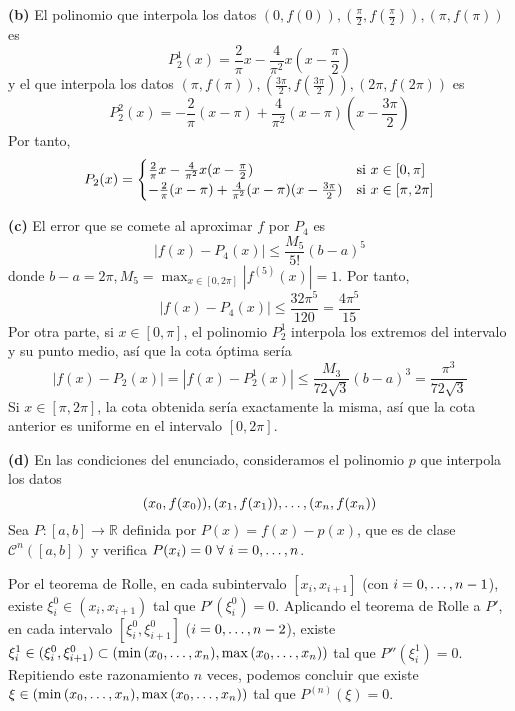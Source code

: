 \documentclass[12pt]{report}
\newcommand{\R}{\mathbb R}
\begin{document}
\vspace{2mm}
\textbf{(b) } El polinomio que interpola los datos $(0,f(0)),(\frac{\pi}{2},f(\frac{\pi}{2})),(\pi,f(\pi))$
es
\[P_2^1(x) = \frac{2}{\pi}x -\frac{4}{\pi^2}x(x-\frac{\pi}{2})\]
y el que interpola los datos $(\pi,f(\pi)),(\frac{3\pi}{2},f(\frac{3\pi}{2})),(2\pi,f(2\pi))$ es
\[P_2^2(x) = -\frac{2}{\pi}(x-\pi) + \frac{4}{\pi^2}(x-\pi)(x-\frac{3\pi}{2})\]
Por tanto,
\[P_2(x) = 
\begin{cases}
\frac{2}{\pi}x -\frac{4}{\pi^2}x(x-\frac{\pi}{2}) & $si$ \ x \in [0,\pi] \\
-\frac{2}{\pi}(x-\pi) + \frac{4}{\pi^2}(x-\pi)(x-\frac{3\pi}{2}) & $si$ \ x \in [\pi,2\pi]
\end{cases}
\]

\vspace{2mm}
\textbf{(c) } El error que se comete al aproximar $f$ por $P_4$ es
\[|f(x) - P_4(x)| \leq \frac{M_5}{5!}(b-a)^5\]
donde $\displaystyle b-a=2\pi, M_5 = \max_{x \in [0,2\pi]}|f^{(5)}(x)| = 1$. Por tanto,
\[|f(x) - P_4(x)| \leq \frac{32\pi^5}{120} = \frac{4\pi^5}{15}\]
Por otra parte, si $x \in [0,\pi]$, el polinomio $P_2^1$ interpola los extremos del intervalo y su punto medio, así que la cota óptima sería
\[|f(x) - P_2(x)| = |f(x) - P_2^1(x)| \leq \frac{M_3}{72\sqrt{3}}(b-a)^3 = \frac{\pi^3}{72\sqrt{3}}\]
Si $x \in [\pi,2\pi]$, la cota obtenida sería exactamente la misma, así que la cota anterior es uniforme en el intervalo $[0,2\pi]$.

\vspace{2mm}
\textbf{(d) } En las condiciones del enunciado, consideramos el polinomio $p$ que interpola los datos
\[(x_0,f(x_0)),(x_1,f(x_1)), \mathellipsis, (x_n,f(x_n))\]
Sea $P \colon [a,b] \to \R$ definida por $P(x) = f(x) - p(x)$, que es de clase $\mathcal{C}^n([a,b])$ y verifica $P(x_i) = 0 \ \forall \ i = 0,\mathellipsis,n$. 

\vspace{2mm}
Por el teorema de Rolle, en cada subintervalo $[x_i, x_{i+1}]$ (con $i = 0, \mathellipsis, n-1$), existe $\xi_i^0 \in (x_i,x_{i+1})$ tal que $P'(\xi_i^0) = 0$. Aplicando el teorema de Rolle a $P'$, en cada intervalo $[\xi_i^0,\xi_{i+1}^0]$ ($i = 0, \mathellipsis, n-2$), existe $\xi_i^1 \in (\xi_i^0,\xi_{i+1}^0) \subset (\min{(x_0,\mathellipsis,x_n)},\max{(x_0,\mathellipsis,x_n)})$ tal que $P''(\xi_i^1) = 0$. Repitiendo este razonamiento $n$ veces, podemos concluir que existe $\xi \in (\min{(x_0,\mathellipsis,x_n)},\max{(x_0,\mathellipsis,x_n)})$ tal que $P^{(n)}(\xi) = 0$. 
\end{document}
